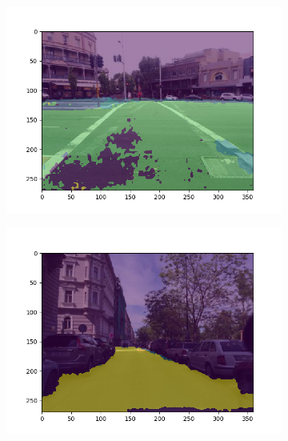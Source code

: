 \begin{figure}
	\begin{subfigure}{.45\textwidth}
		\centering
		\includegraphics[width=\linewidth]{figures/experiments/results-mapillary/5.png}
		\caption[Mapillary Vistas Segmentation Result 5]{}
		\label{fig:mapresult-5}
	\end{subfigure}
	\hfill
	\begin{subfigure}{.45\textwidth}
		\centering
		\includegraphics[width=\linewidth]{figures/experiments/results-mapillary/6.png}
		\caption[Mapillary Vistas Segmentation Result 6]{}
		\label{fig:mapresult-6}
	\end{subfigure}


\end{figure}
